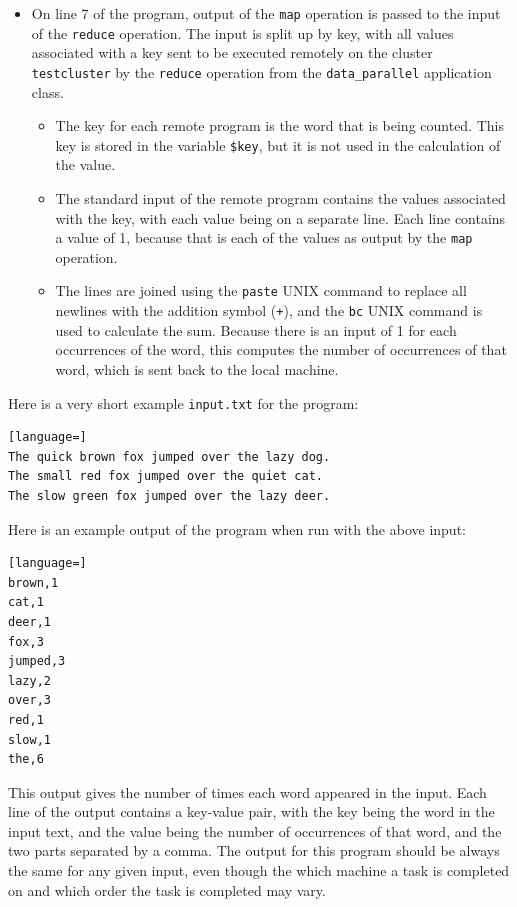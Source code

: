 \documentclass[twoside]{report}
\begin{document}
\begin{itemize}
  \item
        On line 7 of the program, output of the \texttt{map} operation is passed to the input of the \texttt{reduce} operation. The input is split up by key, with all values associated with a key sent to be executed remotely on the cluster \texttt{testcluster} by the \texttt{reduce} operation from the \texttt{data\_parallel} application class.
        \begin{itemize}
          \item The key for each remote program is the word that is being counted. This key is stored in the variable \texttt{\$key}, but it is not used in the calculation of the value.
          \item The standard input of the remote program contains the values associated with the key, with each value being on a separate line. Each line contains a value of 1, because that is each of the values as output by the \texttt{map} operation.
          \item The lines are joined using the \texttt{paste} UNIX command to replace all newlines with the addition symbol (\texttt{+}), and the \texttt{bc} UNIX command is used to calculate the sum.
                Because there is an input of 1 for each occurrences of the word, this computes the number of occurrences of that word, which is sent back to the local machine.
        \end{itemize}
\end{itemize}

Here is a very short example \texttt{input.txt} for the program:
\begin{lstlisting}[language=]
The quick brown fox jumped over the lazy dog.
The small red fox jumped over the quiet cat.
The slow green fox jumped over the lazy deer.
\end{lstlisting}

Here is an example output of the program when run with the above input:
\begin{lstlisting}[language=]
brown,1
cat,1
deer,1
fox,3
jumped,3
lazy,2
over,3
red,1
slow,1
the,6
\end{lstlisting}

This output gives the number of times each word appeared in the input.
Each line of the output contains a key-value pair, with the key being the word in the input text, and the value being the number of occurrences of that word, and the two parts separated by a comma.
The output for this program should be always the same for any given input, even though the which machine a task is completed on and which order the task is completed may vary.
\end{document}
